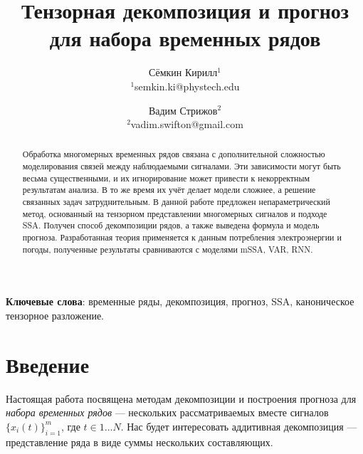 
\usepackage[backend=biber, sorting=none]{biblatex}
\usepackage{subfigure}




\theoremstyle{definition}
\newtheorem*{Def}{Определение}
\theoremstyle{plain}
\newtheorem{Lem}{Лемма}
\newtheorem{Th}{Теорема}

\newcommand{\delayV}[1]{\overset{\leftarrow}{\mathbf{x}}_{#1}}
\newcommand{\delayM}[1]{\overset{\leftarrow}{\mathbf{X}}_{#1}}

\title{Тензорная декомпозиция и прогноз для набора временных рядов}
\author{Сёмкин Кирилл$^{1}$ \\ {\footnotesize $^{1}$semkin.ki@phystech.edu} \and Вадим Стрижов$^{2}$ \\ {\footnotesize $^{2}$vadim.swifton@gmail.com}}
\date{}



	
	\maketitle
	
	\begin{abstract}
		
		Обработка многомерных временных рядов связана с дополнительной сложностью моделирования связей между наблюдаемыми сигналами. Эти зависимости могут быть весьма существенными, и их игнорирование может привести к некорректным результатам анализа. В то же время их учёт делает модели сложнее, а решение связанных задач затруднительным. В данной работе предложен непараметрический метод, основанный на тензорном представлении многомерных сигналов и подходе SSA. Получен способ декомпозиции рядов, а также выведена формула и модель прогноза. Разработанная теория применяется к данным потребления электроэнергии и погоды, полученные результаты сравниваются с моделями mSSA, VAR, RNN.
		
	\end{abstract}
	
	\textbf{Ключевые слова}: {\small временные ряды, декомпозиция, прогноз, SSA, каноническое тензорное разложение}.
	
	
	\section{Введение}\label{Intro}
	
		Настоящая работа посвящена методам декомпозиции и построения прогноза для \textit{набора временных рядов} --- нескольких рассматриваемых вместе сигналов $ \{x_i(t)\}_{i=1}^m $, где $ t \in 1 \ldots N $. Нас будет интересовать аддитивная декомпозиция --- представление ряда в виде суммы нескольких составляющих.
		
